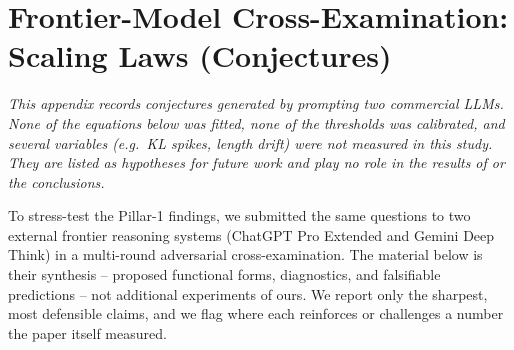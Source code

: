 %

\section{Frontier-Model Cross-Examination: Scaling Laws (Conjectures)}
\label{sec:frontier-scaling}

\emph{This appendix records conjectures generated by prompting two
commercial LLMs.  None of the equations below was fitted, none of the
thresholds was calibrated, and several variables (e.g.\ KL spikes,
length drift) were not measured in this study.  They are listed as
hypotheses for future work and play no role in the results of
 or the conclusions.}

To stress-test the Pillar-1 findings, we submitted the same questions to two
external frontier reasoning systems (ChatGPT Pro Extended and Gemini Deep
Think) in a multi-round adversarial cross-examination. The material below is
their synthesis -- proposed functional forms, diagnostics, and falsifiable
predictions -- not additional experiments of ours. We report only the
sharpest, most defensible claims, and we flag where each reinforces or
challenges a number the paper itself measured.

